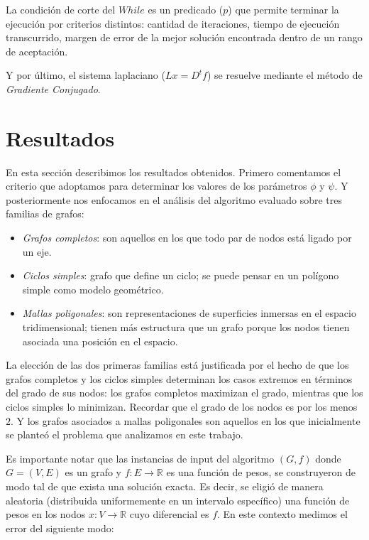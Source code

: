 \documentclass[conference,compsoc,a4paper]{IEEEtran}
\begin{document}
\smallskip

La condición de corte del $While$ es un predicado ($p$) que permite 
terminar la ejecución por criterios distintos: cantidad de iteraciones, 
tiempo de ejecución transcurrido, margen de error de la mejor solución 
encontrada dentro de un rango de aceptación.

\smallskip

Y por último, el sistema laplaciano ($Lx = D^t f$) se resuelve mediante 
el método de \emph{Gradiente Conjugado}.

\section{Resultados}

En esta sección describimos los resultados obtenidos. Primero 
comentamos el criterio que adoptamos para determinar los valores de los 
parámetros $\phi$ y $\psi$. Y posteriormente nos enfocamos en el 
análisis del algoritmo evaluado sobre tres familias de grafos: 

\begin{itemize}
	\item \emph{Grafos completos}: son aquellos en los que todo par de  
	nodos está ligado por un eje.
	\item \emph{Ciclos simples}: grafo que define un ciclo; se puede pensar en un polígono simple como modelo 
	geométrico.
	\item \emph{Mallas poligonales}: son representaciones de superficies 
	inmersas en el espacio tridimensional; tienen más estructura que un 
	grafo porque los nodos tienen asociada una posición en el espacio.
\end{itemize}

La elección de las dos primeras familias está justificada por el hecho 
de que los grafos completos y los ciclos simples determinan los casos 
extremos en términos del grado de sus nodos: los grafos completos 
maximizan el grado, mientras que los ciclos simples lo minimizan. 
Recordar que el grado de los nodos es por los menos $2$. Y los grafos 
asociados a mallas poligonales son aquellos en los que inicialmente se planteó 
el problema que analizamos en este trabajo.

\smallskip

Es importante notar que las instancias de input del algoritmo $(G,f)$ 
donde $G=(V,E)$ es un grafo y $f: E \rightarrow \mathbb{R}$ es una 
función de pesos, se construyeron de modo tal de que exista una 
solución exacta. Es decir, se 
eligió de manera aleatoria (distribuida uniformemente en un intervalo específico)
una función de pesos 
en los nodos $x: V \rightarrow \mathbb{R}$ cuyo diferencial 
es $f$. En este contexto medimos el error 
del siguiente modo:
\end{document}
